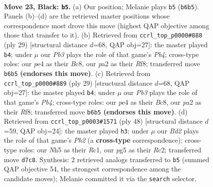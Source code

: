 \documentclass[11pt]{article}
\begin{document}
\clearpage

\begin{figure}[p]\centering
\begin{subfigure}{0.46\textwidth}\centering
\resizebox{\linewidth}{!}{%
\newchessgame
\chessboard[
  setfen={r6r/2qb1kbp/ppnpp1p1/4p1Pn/4P3/2N2P2/PPPK1BQP/RR3B2 b - - 3 23},
  showmover=false,
  pgfstyle=straightmove, color=movearrow, markmove={b6-b5}
]}
\caption{}
\end{subfigure}\hfill
\begin{subfigure}{0.46\textwidth}\centering
\resizebox{\linewidth}{!}{%
\newchessgame
\chessboard[
  setfen={rqb2rk1/3nbppp/p2pp3/1p4P1/3BPP1P/2N2Q2/PPP5/2KR1B1R b - - 0 15},
  showmover=false,
  pgfstyle=straightmove, color=movearrow, markmove={b5-b4}
]}
\caption{}
\end{subfigure}
\\[4pt]
\begin{subfigure}{0.46\textwidth}\centering
\resizebox{\linewidth}{!}{%
\newchessgame
\chessboard[
  setfen={rqb2rk1/3nbppp/p2pp3/1p4P1/3BPP1P/2N2Q2/PPP5/2KR1B1R b - - 0 15},
  showmover=false,
  pgfstyle=straightmove, color=movearrow, markmove={b5-b4}
]}
\caption{}
\end{subfigure}\hfill
\begin{subfigure}{0.46\textwidth}\centering
\resizebox{\linewidth}{!}{%
\newchessgame
\chessboard[
  setfen={2r1qbk1/pnrn1pp1/1pp1p2p/8/PP1P4/2BNP3/2RNQPPP/2R3K1 w - - 5 25},
  showmover=false,
  pgfstyle=straightmove, color=movearrow, markmove={h2-h3}
]}
\caption{}
\end{subfigure}
\caption{\textbf{Move 23, Black: \texttt{b5}.} (a) Our position; Melanie plays \texttt{b5} (\texttt{b6b5}). Panels (b)--(d) are the retrieved master positions whose correspondence most drove this move (highest QAP objective among those that transfer to it). (b) Retrieved from \texttt{ccrl\_top\_p0000\#888} (ply 29) [structural distance $d$=68, QAP obj=27]: the master played \texttt{b4}; under $\mu$ our \emph{Pb3} plays the role of that game's \emph{Pb4}; cross-type roles: our \emph{p}e4 as their \emph{B}c8, our \emph{p}a2 as their \emph{R}f8; transferred move \texttt{b6b5} \textbf{(endorses this move)}. (c) Retrieved from \texttt{ccrl\_top\_p0000\#889} (ply 29) [structural distance $d$=68, QAP obj=27]: the master played \texttt{b4}; under $\mu$ our \emph{Pb3} plays the role of that game's \emph{Pb4}; cross-type roles: our \emph{p}e4 as their \emph{B}c8, our \emph{p}a2 as their \emph{R}f8; transferred move \texttt{b6b5} \textbf{(endorses this move)}. (d) Retrieved from \texttt{ccrl\_top\_p0003\#1571} (ply 48) [structural distance $d$=59, QAP obj=24]: the master played \texttt{h3}; under $\mu$ our \emph{Bd2} plays the role of that game's \emph{Ph2} (a \textbf{cross-type} correspondence); cross-type roles: our \emph{N}h5 as their \emph{R}c1, our \emph{p}g5 as their \emph{R}c2; transferred move \texttt{d7c8}. Synthesis: 2 retrieved analogs transferred to \texttt{b5} (summed QAP objective 54, the strongest correspondence among the candidate moves); Melanie committed it via the \texttt{search} selector.}
\label{fig:thought-m45}
\end{figure}
\end{document}
